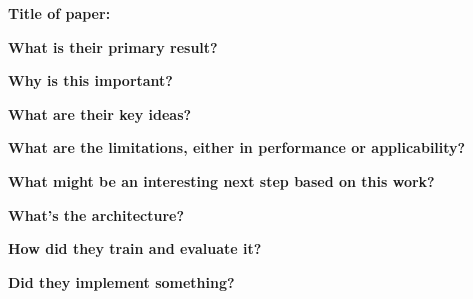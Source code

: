 \noindent \textbf{Title of paper:} 

\noindent\textbf{What is their primary result?}

\noindent\textbf{Why is this important?}

\noindent\textbf{What are their key ideas?}

\noindent\textbf{What are the limitations, either in performance or applicability?}

\noindent\textbf{What might be an interesting next step based on this work?}

\noindent\textbf{What's the architecture?}

\noindent\textbf{How did they train and evaluate it?}

\noindent\textbf{Did they implement something?}


